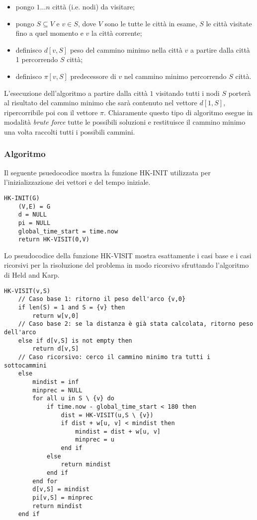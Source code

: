 \begin{itemize}
    \item  pongo \(1 ... n\) città (i.e. nodi) da visitare;
    \item  pongo \(S \subseteq V\) e \(v \in S\), dove \(V\) sono le tutte le città in esame, \(S\) le città visitate fino a quel momento e \(v\) la città corrente;

\item definisco \(d[v, S]\) peso del cammino minimo nella città \(v\) a partire dalla città 1 percorrendo \(S\) città;
\item definisco \(\pi[v, S]\) predecessore di \(v\) nel cammino minimo percorrendo \(S\) città.
\end{itemize}

L'esecuzione dell'algoritmo a partire dalla città \(1\) visitando tutti i nodi \(S\) porterà al risultato del cammino minimo che sarà contenuto nel vettore \(d[1, S]\), ripercorribile poi con il vettore \(\pi\). Chiaramente questo tipo di algoritmo esegue in modalità \textit{brute force} tutte le possibili soluzioni e restituisce il cammino minimo una volta raccolti tutti i possibili cammini.

\subsubsection{Algoritmo}

Il seguente psuedocodice mostra la funzione HK-INIT utilizzata per l'inizializzazione dei vettori e del tempo iniziale. 
\begin{verbatim}
HK-INIT(G)
    (V,E) = G
    d = NULL
    pi = NULL
    global_time_start = time.now
    return HK-VISIT(0,V)
\end{verbatim}    

Lo pseudocodice della funzione HK-VISIT mostra esattamente i casi base e i casi ricorsivi per la risoluzione del problema in modo ricorsivo sfruttando l'algoritmo di Held and Karp.
\begin{verbatim}
HK-VISIT(v,S)
    // Caso base 1: ritorno il peso dell'arco {v,0}
    if len(S) = 1 and S = {v} then 
        return w[v,0]
    // Caso base 2: se la distanza è già stata calcolata, ritorno peso dell'arco
    else if d[v,S] is not empty then 
        return d[v,S]
    // Caso ricorsivo: cerco il cammino minimo tra tutti i sottocammini
    else
        mindist = inf
        minprec = NULL
        for all u in S \ {v} do
            if time.now - global_time_start < 180 then
                dist = HK-VISIT(u,S \ {v})
                if dist + w[u, v] < mindist then
                    mindist = dist + w[u, v]
                    minprec = u
                end if
            else
                return mindist
            end if
        end for
        d[v,S] = mindist
        pi[v,S] = minprec
        return mindist
    end if
\end{verbatim}


